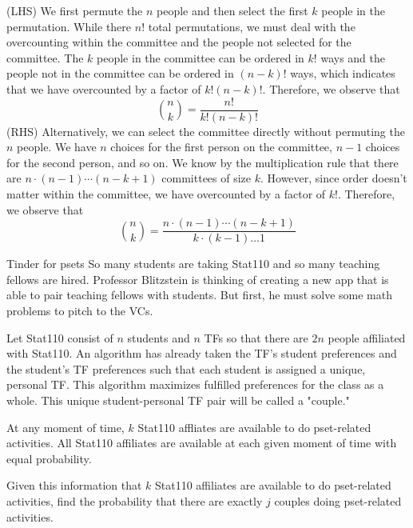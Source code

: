 \documentclass[11pt]{article}
\begin{document}
\begin{solution}{4}
\begin{enumerate}
    (LHS) We first permute the $n$ people and then
    select the first $k$ people in the
    permutation. While there $n!$ total permutations,
    we must deal with the overcounting within
    the committee and the people not selected
    for the committee. The $k$ people in the 
    committee can be ordered in $k!$ ways 
    and the people not in the committee can
    be ordered in $(n-k)!$ ways, which indicates that we have overcounted by a factor of $k!(n-k)!$.
    Therefore, we observe that 
        $${n \choose k} = \frac{n!}{k!(n-k)!}$$
    (RHS) Alternatively, we can select the 
    committee directly without permuting the $n$ 
    people. We have $n$ choices for the first
    person on the committee, $n-1$ choices 
    for the second person, and so on. We know
    by the multiplication rule that there
    are $n \cdot (n-1) \dotsm (n-k+1)$ committees
    of size $k$. However, since order doesn't matter
    within the committee, we have overcounted
    by a factor of $k!$. Therefore, we observe
    that
        $${n\choose k} = \frac{n \cdot (n-1) \dotsm (n-k+1)}{k \cdot(k-1)\dots1}$$
\end{enumerate}
\end{solution}
\newpage
\begin{exercise}{Tinder for psets}
So many students are taking Stat110 and so many teaching fellows are hired.  Professor Blitzstein is thinking of creating a new app that is able to pair teaching fellows with students.  But first, he must solve some math problems to pitch to the VCs.

Let Stat110 consist of $n$ students and $n$ TFs so that there are $2n$ people affiliated with Stat110.  An algorithm has already taken the TF's student preferences and the student's TF preferences such that each student is assigned a unique, personal TF.  This algorithm maximizes fulfilled preferences for the class as a whole.  This unique student-personal TF pair will be called a "couple."

At any moment of time, $k$ Stat110 affliates are available to do pset-related activities.  All Stat110 affiliates are available at each given moment of time with equal probability.

Given this information that $k$ Stat110 affiliates are available to do pset-related activities, find the probability that there are exactly $j$ couples doing pset-related activities. 

\end{exercise}
\end{document}
